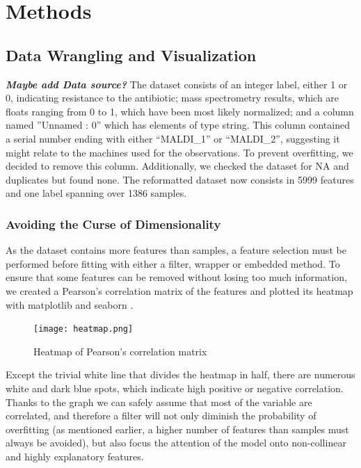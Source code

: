 \documentclass{article}
\begin{document}
\section{Methods}

\subsection{Data Wrangling and Visualization}
\textbf{\textit{Maybe add Data source? 
}}The dataset consists of an integer label, either 1 or 0, indicating resistance to the antibiotic; mass
spectrometry results, which are floats ranging from 0 to 1, which have been most likely normalized; and a
column named ”Unnamed : 0” which has elements of type string. This column contained a serial number
ending with either “MALDI\_1” or “MALDI\_2”, suggesting it might relate to the machines used for the
observations. To prevent overfitting, we decided to remove this column. Additionally, we checked the
dataset for NA and duplicates but found none. The reformatted dataset now consists in 5999 features
and one label spanning over 1386 samples. 

\subsubsection{Avoiding the Curse of Dimensionality}

As the dataset contains more features than samples, a feature
selection must be performed before fitting with either a filter, wrapper or embedded method. To ensure
that some features can be removed without losing too much information, we created a Pearson’s correlation
matrix of the features and plotted its heatmap with matplotlib \citep{matplotlib} and seaborn \citep{seaborn}.\\

\begin{figure}
	\centering
	\texttt{[image: heatmap.png]}
	 \vspace{-3em}
	\caption{Heatmap of Pearson's correlation matrix}
\end{figure}

Except the trivial white line that divides the heatmap in half, there are numerous white and dark blue spots, which indicate high positive or negative correlation. Thanks to the graph we can safely assume that most of the variable are correlated, and therefore a filter will not only diminish the probability of overfitting (as mentioned earlier, a higher number of features than samples must always be avoided), but also focus the attention of the model onto non-collinear and highly explanatory features. 
\end{document}
